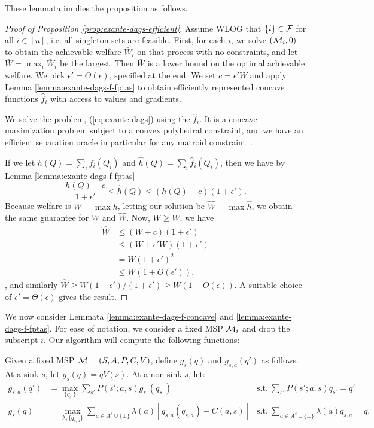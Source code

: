 These lemmata implies the proposition as follows.
\begin{proof}[Proof of Proposition \ref{prop:exante-dags-efficient}]
  Assume WLOG that $\{i\} \in \mathcal{F}$ for all $i \in [n]$, i.e. all singleton sets are feasible.
  First, for each $i$, we solve \SAUP$(\mathcal{M}_i,0)$ to obtain the achievable welfare $\bar{W}_i$ on that process with no constraints, and let $\bar{W} = \max_i \bar{W}_i$ be the largest.
  Then $\bar{W}$ is a lower bound on the optimal achievable welfare.
  We pick $\epsilon' = \Theta(\epsilon)$, specified at the end.
  We set $c = \epsilon' \bar{W}$ and apply Lemma \ref{lemma:exante-dags-f-fptas} to obtain efficiently represented concave functions $\hat{f}_i$ with access to values and gradients.

  We solve the problem, (\ref{eq:exante-dags}) using the $\hat{f}_i$.
  It is a concave maximization problem subject to a convex polyhedral constraint, and we have an efficient separation oracle in particular for any matroid constraint~\citep{cunningham1984testing}.

  If we let $h(Q) = \sum_i f_i(Q_i)$ and $\hat{h}(Q) = \sum_i \hat{f}_i(Q_i)$, then we have by Lemma \ref{lemma:exante-dags-f-fptas}
    \[ \frac{h(Q) - c}{1+\epsilon'} \leq \hat{h}(Q) \leq (h(Q) + c)(1+\epsilon') . \]
  Because welfare is $W = \max h$, letting our solution be $\hat{W} = \max \hat{h}$, we obtain the same guarantee for $W$ and $\hat{W}$.
  Now, $W \geq \bar{W}$, we have
  \begin{align*}
    \hat{W} &\leq (W + c)(1+\epsilon')  \\
      &\leq (W + \epsilon' W)(1+\epsilon')  \\
      &= W (1+\epsilon')^2  \\
      &\leq W (1+O(\epsilon')),
  \end{align*},
  and similarly $\hat{W} \geq W(1-\epsilon')/(1+\epsilon') \geq W(1 - O(\epsilon))$.
  A suitable choice of $\epsilon' = \Theta(\epsilon)$ gives the result.
\end{proof}

We now consider Lemmata \ref{lemma:exante-dags-f-concave} and \ref{lemma:exante-dags-f-fptas}.
For ease of notation, we consider a fixed MSP $\mathcal{M}_i$ and drop the subscript $i$.
Our algorithm will compute the following functions:
\begin{definition} \label{def:exante-dags-g}
  Given a fixed MSP $\mathcal{M} = (S,A,P,C,V)$, define $g_s(q)$ and $g_{s,a}(q')$ as follows.
  At a sink $s$, let $g_s(q) = q V(s)$.
  At a non-sink $s$, let:
  \begin{align*}
    g_{s,a}(q') &= \max_{\{q_{s'}\}} \sum_{s'} P(s';a,s) g_{s'}(q_{s'})  & \text{s.t.} ~ \sum_{s'} P(s';a,s) q_{s'} = q'  \\
    g_s(q) &= \max_{\lambda,\{q_{s,a}\}} \sum_{a \in A^s \cup \{\bot\}} \lambda(a) \left[ g_{s,a}(q_{s,a}) - C(a,s) \right]  & \text{s.t.} ~ \sum_{a \in A^s \cup \{\bot\}} \lambda(a) q_{s,a} = q .
  \end{align*}
\end{definition}

